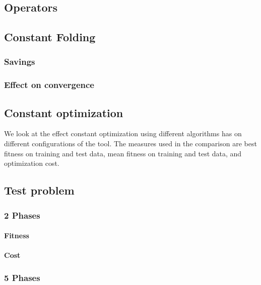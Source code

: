 \subsection{Operators}


\subsection{Constant Folding}
\subsubsection{Savings}
\subsubsection{Effect on convergence}

\subsection{Constant optimization}
We look at the effect constant optimization using different algorithms has on different configurations of the tool. The measures used in the comparison are best fitness on training and test data, mean fitness on training and test data, and optimization cost.

\subsection{Test problem}

\subsubsection{2 Phases}
\paragraph{Fitness}
\paragraph{Cost}

\subsubsection{5 Phases}
